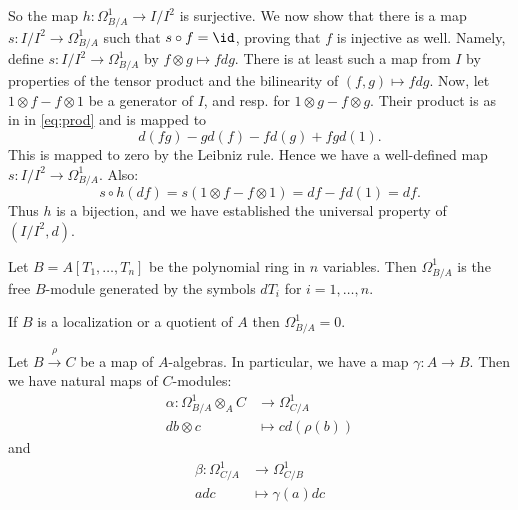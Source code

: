 \documentclass[11pt, english]{article}
\begin{document}
\begin{sol}
So the map $h: \Omega_{B/A} ^1 \to I/I^2$ is surjective. We now show that there is a map $s:I/I^2 \to \Omega_{B/A}^1$ such that $s \circ f = \id$, proving that $f$ is injective as well. Namely, define $s:I/I^2 \to \Omega^1_{B/A}$ by $f \otimes g \mapsto f dg$. There is at least such a map from $I$ by properties of the tensor product and the bilinearity of $(f,g) \mapsto f dg$. Now, let $1 \otimes f - f \otimes 1$ be a generator of $I$, and resp. for $1 \otimes g - f \otimes g$. Their product is as in in \eqref{eq:prod} and is mapped to 
\[
d(fg) - gd(f) - fd(g) + fgd(1).
\]
This is mapped to zero by the Leibniz rule. Hence we have a well-defined map $s:I/I^2 \to \Omega_{B/A}^1$. Also:
\[
s \circ h(df) = s(1 \otimes f - f \otimes 1) = df - fd(1) = df.
\]
Thus $h$ is a bijection, and we have established the universal property of $(I/I^2,d)$. 
\end{sol}

\begin{example}
\label{ex:om}
Let $B=A[T_1,\dotsc, T_n]$ be the polynomial ring in $n$ variables. Then $\Omega_{B/A}^1$ is the free $B$-module generated by the symbols $dT_i$ for $i=1,\dotsc,n$.
\end{example}

\begin{example}
If $B$ is a localization or a quotient of $A$ then $\Omega_{B/A}^1 = 0$.
\end{example}

Let $B \xrightarrow{\rho} C$ be a map of $A$-algebras. In particular, we have a map $\gamma:A \to B$.  Then we have natural maps of $C$-modules:
\begin{align*}
\alpha: \Omega_{B/A}^1 \otimes_A C &\to \Omega_{C/A}^1 \\
db \otimes c &\mapsto cd(\rho(b))
\end{align*}
and
\begin{align*}
\beta:\Omega_{C/A}^1 &\to \Omega_{C/B} ^1  \\
a dc &\mapsto \gamma(a) dc
\end{align*}
\end{document}
